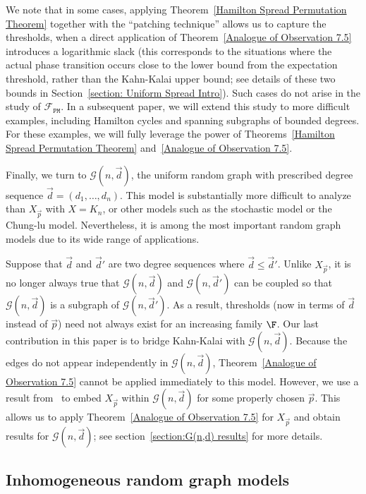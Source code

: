 \documentclass[12pt]{article}
\begin{document}
We note that in some cases, applying Theorem~\ref{Hamilton Spread Permutation Theorem} together with the ``patching technique'' allows us to capture the thresholds,  when a direct application of Theorem~\ref{Analogue of Observation 7.5} introduces a logarithmic slack (this corresponds to the situations where the actual phase transition occurs close to the lower bound from the expectation threshold, rather than the Kahn-Kalai upper bound; see details of these two bounds in Section~\ref{section: Uniform Spread Intro}). Such cases do not arise in the study of $\mathcal{F}_{\texttt{PM}}$.
In a subsequent paper, we will extend this study to more difficult examples, including Hamilton cycles and spanning subgraphs of bounded degrees. For these examples, we will fully leverage the power of Theorems~\ref{Hamilton Spread Permutation Theorem} and~\ref{Analogue of Observation 7.5}.


Finally, we turn to ${\mathcal G}(n,\vec{d})$, the uniform random graph with prescribed degree sequence $\vec{d}=(d_1,\ldots,d_n)$.
This model is substantially more difficult to analyze than $X_{\vec{p}}$ with $X=K_n$, or other models such as the stochastic model or the Chung-lu model. Nevertheless, it is among the most important random graph models due to its wide range of applications.

 Suppose that $\vec{d}$ and $\vec{d}'$ are two degree sequences where $\vec{d}\le \vec{d}'$. Unlike $X_{\vec{p}}$, it is no longer always true that ${\mathcal G}(n,\vec{d})$ and ${\mathcal G}(n,\vec{d}')$ can be coupled so that ${\mathcal G}(n,\vec{d})$ is a subgraph of ${\mathcal G}(n,\vec{d}')$. As a result, thresholds (now in terms of $\vec{d}$ instead of $\vec{p}$) need not always exist for an increasing family $\F$.
Our last contribution in this paper is to bridge Kahn-Kalai with $\mathcal{G}(n,\vec{d})$. Because the edges do not appear independently in $\mathcal{G}(n,\vec{d})$, Theorem~\ref{Analogue of Observation 7.5} cannot be applied immediately to this model. However, we use a result from~\cite{Gao_2024} to embed $X_{\vec{p}}$ within $\mathcal{G}(n,\vec{d})$ for some properly chosen $\vec{p}$. This allows us to apply Theorem~\ref{Analogue of Observation 7.5} for $X_{\vec{p}}$ and obtain results for $\mathcal{G}(n,\vec{d})$; see section~\ref{section:G(n,d) results} for more details.



\subsection{Inhomogeneous random graph models}\label{section: Random Graph Models}
\end{document}
